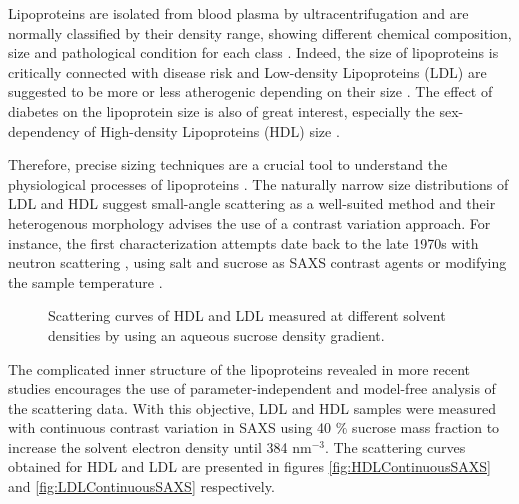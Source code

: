 Lipoproteins are isolated from blood plasma by ultracentrifugation \citep{havel_distribution_1955} and are normally classified by their density range, showing different chemical composition, size and pathological condition for each class \citep{german_lipoproteins:_2006}. Indeed, the size of lipoproteins is critically connected with disease risk \citep{gardner_cd_association_1996} and Low-density Lipoproteins (LDL) are suggested to be more or less atherogenic depending on their size \citep{dreon_low-density_1994}. The effect of diabetes on the lipoprotein size is also of great interest, especially the sex-dependency of High-density Lipoproteins (HDL) size \citep{colhoun_lipoprotein_2002}.

Therefore, precise sizing techniques are a crucial tool to understand the physiological processes of lipoproteins \citep{german_lipoproteins:_2006}. The naturally narrow size distributions of LDL and HDL suggest small-angle scattering as a well-suited method and their heterogenous morphology advises the use of a contrast variation approach. For instance, the first characterization attempts date back to the late 1970s with neutron scattering \citep{stuhrmann_neutron_1975}, using salt \citep{tardieu_structure_1976} and sucrose \citep{muller_structure_1978} as SAXS contrast agents or modifying the sample temperature \citep{laggner_molecular_1977,luzzati_structure_1979}. 

\begin{figure}
	\centering
		\subfloat[HDL]{\resizebox{0.44\linewidth}{!}{}\label{fig:HDLContinuousSAXS}}
		\subfloat[LDL]{\resizebox{0.44\linewidth}{!}{}\label{fig:LDLContinuousSAXS}}
		\caption[Continuous contrast variation experimental data of HDL and LDL.]{Scattering curves of HDL and LDL measured at different solvent densities by using an aqueous sucrose density gradient.}
\end{figure}

The complicated inner structure of the lipoproteins revealed in more recent studies \citep{baumstark_structure_1990,schnitzer_re-evaluation_1994} encourages the use of parameter-independent and model-free analysis of the scattering data. With this objective, LDL and HDL samples were measured with continuous contrast variation in SAXS using 40 $\%$ sucrose mass fraction to increase the solvent electron density until 384 nm$^{-3}$. The scattering curves obtained for HDL and LDL are presented in figures \ref{fig:HDLContinuousSAXS} and \ref{fig:LDLContinuousSAXS} respectively.

